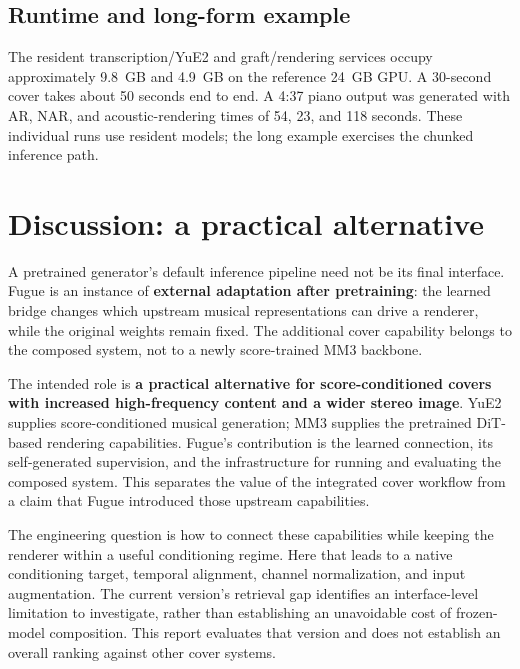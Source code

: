 \documentclass[11pt,a4paper]{article}
\begin{document}
\subsection{Runtime and long-form example}

The resident transcription/YuE2 and graft/rendering services occupy approximately 9.8~GB and 4.9~GB on the reference 24~GB GPU. A 30-second cover takes about 50 seconds end to end. A 4:37 piano output was generated with AR, NAR, and acoustic-rendering times of 54, 23, and 118 seconds. These individual runs use resident models; the long example exercises the chunked inference path.

\section{Discussion: a practical alternative}

A pretrained generator's default inference pipeline need not be its final interface. Fugue is an instance of \textbf{external adaptation after pretraining}: the learned bridge changes which upstream musical representations can drive a renderer, while the original weights remain fixed. The additional cover capability belongs to the composed system, not to a newly score-trained MM3 backbone.

The intended role is \textbf{a practical alternative for score-conditioned covers with increased high-frequency content and a wider stereo image}. YuE2 supplies score-conditioned musical generation; MM3 supplies the pretrained DiT-based rendering capabilities. Fugue's contribution is the learned connection, its self-generated supervision, and the infrastructure for running and evaluating the composed system. This separates the value of the integrated cover workflow from a claim that Fugue introduced those upstream capabilities.

The engineering question is how to connect these capabilities while keeping the renderer within a useful conditioning regime. Here that leads to a native conditioning target, temporal alignment, channel normalization, and input augmentation. The current version's retrieval gap identifies an interface-level limitation to investigate, rather than establishing an unavoidable cost of frozen-model composition. This report evaluates that version and does not establish an overall ranking against other cover systems.
\end{document}
